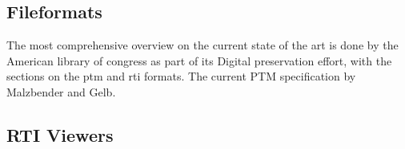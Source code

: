 
\subsection{Fileformats}\label{sec_relfile}
The most comprehensive overview on the current state of the art is done by the
American library of congress as part of its Digital preservation effort, with
the sections on the ptm\cite{library_of_congress_polynomial_2018} and
rti\cite{library_of_congress_reflectance_2018} formats. The current PTM
specification by Malzbender and Gelb\cite{malzbender_polynomial_nodate}.

\subsection{RTI Viewers}

